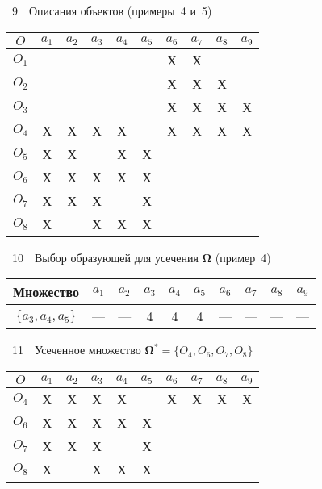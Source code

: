 \begin{multicols}{2}
\noindent
{\small
 \begin{center}  %
{{\tablename~9}\ \ \small{Описания объектов (примеры~4 и~5)}}

\vspace*{2ex}

      \begin{tabular}{|c|c|c|c|c|c|c|c|c|c|}
\hline
$O$&$a_1$&$a_2$&$a_3$&$a_4$&$a_5$&$a_6$&$a_7$&$a_8$&$a_9$\\
\hline
$O_1$&&&&&&Х&Х&&\\
$O_2$&&&&&&Х&Х&Х&\\
$O_3$&&&&&&Х&Х&Х&Х\\
$O_4$&Х&Х&Х&Х&&Х&Х&Х&Х\\
$O_5$&Х&Х&&Х&Х&&&&\\
$O_6$&Х&Х&Х&Х&Х&&&&\\
$O_7$&Х&Х&Х&&Х&&&&\\
$O_8$&Х&&Х&Х&Х&&&&\\
\hline
\end{tabular}
\end{center}
}

\vspace*{6pt}

\noindent
{\small


 \begin{center}  %
\parbox{76mm}{{\tablename~10}\ \ \small{Выбор образующей для усечения ${\boldsymbol{\Omega}}$ (пример~4)}}

\vspace*{2ex}
     \tabcolsep=4pt
      \begin{tabular}{|c|c|c|c|c|c|c|c|c|c|}
\hline
Множество&$a_1$&$a_2$&$a_3$&$a_4$&$a_5$&$a_6$&$a_7$&$a_8$&$a_9$\\
\hline
$\{a_3, a_4, a_5\}$&---&---&4&4&4&---&---&---&---\\
\hline
\end{tabular}
\end{center}
}

\vspace*{6pt}

\noindent
{\small
 \begin{center}  %
{{\tablename~11}\ \ \small{Усеченное множество ${\boldsymbol{\Omega}}^*= \{O_4, O_6, O_7, O_8\}$}}

\vspace*{2ex}

      \tabcolsep=6.4pt
      \begin{tabular}{|c|c|c|c|c|c|c|c|c|c|}
\hline
$O$&\cellcolor[gray]{.6}$a_1$&$a_2$&\cellcolor[gray]{.6}$a_3$&$a_4$&$a_5$&$a_6$&$a_7$&$a_8$&$a_9$\\
\hline
$O_4$&\cellcolor[gray]{.6}Х&Х&\cellcolor[gray]{.6}Х&Х&&Х&Х&Х&Х\\
$O_6$&\cellcolor[gray]{.6}Х&Х&\cellcolor[gray]{.6}Х&Х&Х&&&&\\
$O_7$&\cellcolor[gray]{.6}Х&Х&\cellcolor[gray]{.6}Х&&Х&&&&\\
$O_8$&\cellcolor[gray]{.6}Х&&\cellcolor[gray]{.6}Х&Х&Х&&&&\\
\hline
\end{tabular}
\end{center}
}


\end{multicols}
